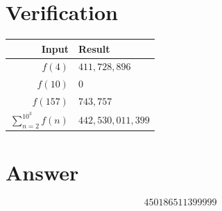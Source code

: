 \documentclass[11pt]{article}
\begin{document}
\section{Verification}

\begin{center}
\begin{tabular}{rl}
\toprule
Input & Result \\
\midrule
$f(4)$ & $411{,}728{,}896$ \\
$f(10)$ & $0$ \\
$f(157)$ & $743{,}757$ \\
$\sum_{n=2}^{10^3} f(n)$ & $442{,}530{,}011{,}399$ \\
\bottomrule
\end{tabular}
\end{center}

\section{Answer}

\[
\boxed{450186511399999}
\]
\end{document}
